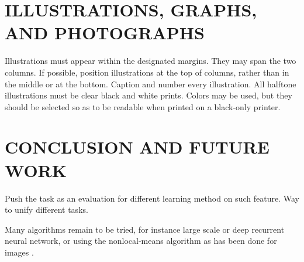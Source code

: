 \documentclass{article}
\begin{document}
\section{ILLUSTRATIONS, GRAPHS, AND PHOTOGRAPHS}
\label{sec:illust}

Illustrations must appear within the designated margins.  They may span the two
columns.  If possible, position illustrations at the top of columns, rather
than in the middle or at the bottom.  Caption and number every illustration.
All halftone illustrations must be clear black and white prints.  Colors may be
used, but they should be selected so as to be readable when printed on a
black-only printer.


\section{CONCLUSION AND FUTURE WORK}
\label{sec:conclusion}
Push the task as an evaluation for different learning method on such feature.
Way to unify different tasks.

Many algorithms remain to be tried, for instance large scale or deep recurrent
neural network, or using the nonlocal-means algorithm as has been done for
images \cite{Buades2005}.






\end{document}
